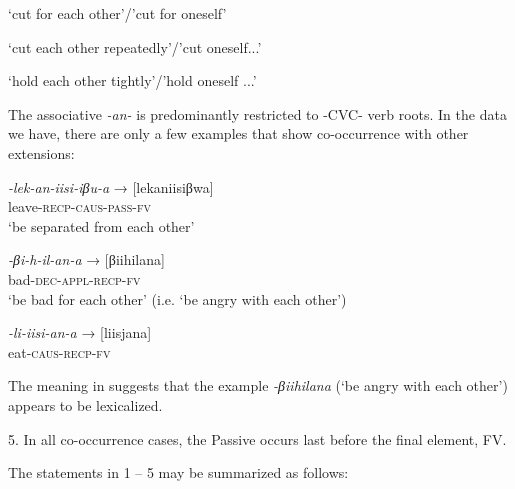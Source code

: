 \documentclass[output=paper		  ]{langscibook}
\begin{document}
     {‘cut for each other’/’cut for oneself’}

     {‘cut each other repeatedly’/’cut oneself...’}

     {‘hold each other tightly’/’hold oneself ...’}
    \z
\z

{The associative} {\textit{{}-an-}} {is predominantly restricted to -CVC- verb roots. In the data we have, there are only a few examples that show co-occurrence with other extensions:}

\ea\label{ex:kahigi:50}
    \ea\label{ex:kahigi:50a} \gll \textit{{}-lek-an-iisi-iβu-a}  → [lekaniisiβwa]\\
 leave-\textsc{recp-caus-pass-fv}\\
 \glt ‘be separated from each other’

 \ex\label{ex:kahigi:50b} \gll \textit{{}-βi-h-il-an-a}    → [βiihilana]\\
  bad-\textsc{dec-appl-recp-fv}\\
 \glt ‘be bad for each other’ {(i.e. ‘be angry with each other’)}

    \ex\label{ex:kahigi:50c} \gll \textit{{}-li-iisi-an-a}    → [liisjana]\\
        eat-\textsc{caus-recp-fv}\\
    \z
\z

{The meaning in  suggests that the example} {\textit{{}-βiihilana}} {(‘be angry with each other’) appears to be lexicalized.}

{5. In all co-occurrence cases, the Passive occurs last before the final element, FV.}

{The statements in 1 -- 5 may be summarized as follows:}
\end{document}
